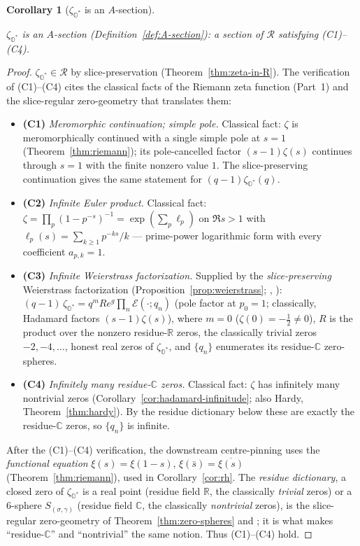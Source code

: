 \documentclass[11pt]{article}
\newcommand{\OO}{\mathbb{O}}
\newcommand{\CC}{\mathbb{C}}
\newcommand{\RR}{\mathbb{R}}
\newcommand{\Ostar}{\OO^{*}}
\newcommand{\zetaO}{\zeta_{\Ostar}}
\providecommand{\lean}[1]{}
\providecommand{\uses}[1]{}
\theoremstyle{plain}
\newtheorem{corollary}[theorem]{Corollary}
\theoremstyle{definition}
\theoremstyle{remark}
\begin{document}
\begin{corollary}[$\zetaO$ is an $A$-section]\label{cor:zeta-section}
\lean{zetaSection, zetaC3_multipliable_proved, zetaC3_locMajorant_proved}
\uses{def:A-section, thm:zeta-in-R, thm:riemann, thm:euler, cor:hadamard-infinitude, prop:weierstrass, thm:zero-spheres}
$\zetaO$ is an $A$-section \textup{(Definition~\ref{def:A-section})}: a section of
$\mathcal R$ satisfying \textup{(C1)--(C4)}.
\end{corollary}
\begin{proof}
$\zetaO\in\mathcal R$ by slice-preservation (Theorem~\ref{thm:zeta-in-R}). The verification of
\textup{(C1)--(C4)} cites the classical facts of the Riemann zeta function (Part~1) and the
slice-regular zero-geometry that translates them:
\begin{itemize}[leftmargin=2em]
\item \textbf{(C1)} \emph{Meromorphic continuation; simple pole.} Classical fact: $\zeta$ is
  meromorphically continued with a single simple pole at $s=1$ (Theorem~\ref{thm:riemann});
  its pole-cancelled factor $(s-1)\zeta(s)$ continues through $s=1$ with the finite nonzero
  value $1$.  The slice-preserving continuation gives the same statement for
  $(q-1)\zetaO(q)$.
\item \textbf{(C2)} \emph{Infinite Euler product.} Classical fact: $\zeta=\prod_p(1-p^{-s})^{-1}
  =\exp(\sum_p\ell_p)$ on $\Re s>1$ with $\ell_p(s)=\sum_{k\ge1}p^{-ks}/k$ --- prime-power
  logarithmic form with every coefficient $a_{p,k}=1$.
\item \textbf{(C3)} \emph{Infinite Weierstrass factorization.} Supplied by the
  \emph{slice-preserving} Weierstrass factorization (Proposition~\ref{prop:weierstrass};
  \cite[Prop.~3.1, Thm.~3.2]{AdFslice}, \cite{GV}):
  $(q-1)\,\zetaO=q^{m}Re^{g}\prod_n\mathcal E(\cdot;q_n)$ \textup{(}pole factor at $p_0=1$;
  classically, Hadamard factors $(s-1)\zeta(s)$\textup{)}, where $m=0$
  \textup{(}$\zeta(0)=-\tfrac12\neq0$\textup{)}, $R$ is the product over the nonzero
  residue-$\RR$ zeros, the classically trivial zeros $-2,-4,\dots$, honest real zeros of
  $\zetaO$, and $\{q_n\}$ enumerates its residue-$\CC$ zero-spheres.
\item \textbf{(C4)} \emph{Infinitely many residue-$\CC$ zeros.} Classical fact: $\zeta$ has
  infinitely many nontrivial zeros (Corollary~\ref{cor:hadamard-infinitude}; also Hardy,
  Theorem~\ref{thm:hardy}). By the residue dictionary below these are exactly the residue-$\CC$
  zeros, so $\{q_n\}$ is infinite.
\end{itemize}
After the \textup{(C1)--(C4)} verification, the downstream centre-pinning uses the
\emph{functional equation} $\xi(s)=\xi(1-s)$,
$\xi(\bar s)=\overline{\xi(s)}$ (Theorem~\ref{thm:riemann}), used in Corollary~\ref{cor:rh}. The
\emph{residue dictionary}, a closed zero of $\zetaO$ is a real point (residue field $\RR$, the
classically \emph{trivial} zeros) or a $6$-sphere $S_{(\sigma,\gamma)}$ (residue field $\CC$, the
classically \emph{nontrivial} zeros), is the slice-regular zero-geometry of
Theorem~\ref{thm:zero-spheres} and \cite{AdF}; it is what makes ``residue-$\CC$'' and
``nontrivial'' the same notion. Thus \textup{(C1)--(C4)} hold.
\end{proof}
\end{document}
